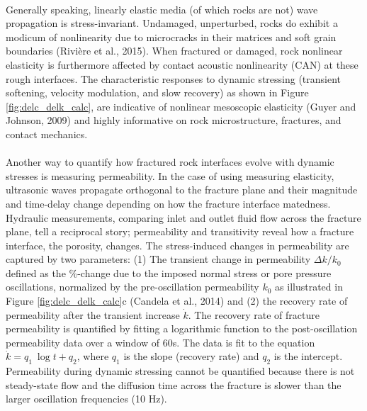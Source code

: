 \paragraph{}
Generally speaking, linearly elastic media (of which rocks are not) wave propagation is stress-invariant. Undamaged, unperturbed, rocks do exhibit a modicum of nonlinearity due to microcracks in their matrices and soft grain boundaries (Rivière et al., 2015). When fractured or damaged, rock nonlinear elasticity is furthermore affected by contact acoustic nonlinearity (CAN) at these rough interfaces. The characteristic responses to dynamic stressing (transient softening, velocity modulation, and slow recovery) as shown in Figure \ref{fig:delc_delk_calc}, are indicative of nonlinear mesoscopic elasticity (Guyer and Johnson, 2009) and highly informative on rock microstructure, fractures, and contact mechanics.
\paragraph{}
Another way to quantify how fractured rock interfaces evolve with dynamic stresses is measuring permeability. In the case of using measuring elasticity, ultrasonic waves propagate orthogonal to the fracture plane and their magnitude and time-delay change depending on how the fracture interface matedness. Hydraulic measurements, comparing inlet and outlet fluid flow across the fracture plane, tell a reciprocal story; permeability and transitivity reveal how a fracture interface, the porosity, changes. The stress-induced changes in permeability are captured by two parameters: (1) The transient change in permeability $ \Delta k/k_0 $ defined as the \%-change due to the imposed normal stress or pore pressure oscillations, normalized by the pre-oscillation permeability $ k_0 $ as illustrated in Figure \ref{fig:delc_delk_calc}c (Candela et al., 2014) and (2) the recovery rate of permeability after the transient increase $ \dot k $. The recovery rate of fracture permeability is quantified by fitting a logarithmic function to the post-oscillation permeability data over a window of 60s. The data is fit to the equation $ \dot k = q_1\ \log{t} + q_2 $, where $q_1$ is the slope (recovery rate) and $q_2$ is the intercept. Permeability during dynamic stressing cannot be quantified because there is not steady-state flow and the diffusion time across the fracture is slower than the larger oscillation frequencies (10 Hz). 
